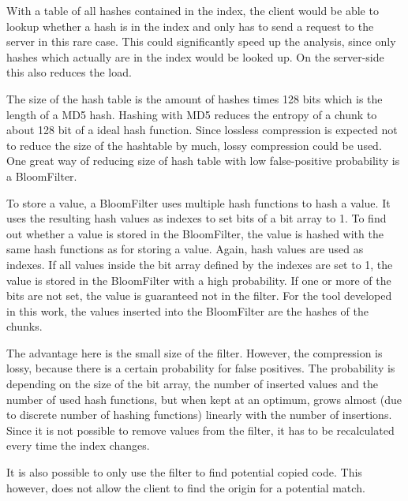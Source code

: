 With a table of all hashes contained in the index, the client would be able to lookup whether a hash is in the index and only has to send a request to the server in this rare case.
This could significantly speed up the analysis, since only hashes which actually are in the index would be looked up.
On the server-side this also reduces the load.

The size of the hash table is the amount of hashes times 128 bits which is the length of a MD5 hash.
Hashing with MD5 reduces the entropy of a chunk to about 128 bit of a ideal hash function.
Since lossless compression is expected not to reduce the size of the hashtable by much, lossy compression could be used.
One great way of reducing size of hash table with low false-positive probability is a BloomFilter.

To store a value, a BloomFilter uses multiple hash functions to hash a value\cite{bloom1970filter}.
It uses the resulting hash values as indexes to set bits of a bit array to 1.
To find out whether a value is stored in the BloomFilter, the value is hashed with the same hash functions as for storing a value.
Again, hash values are used as indexes.
If all values inside the bit array defined by the indexes are set to 1, the value is stored in the BloomFilter with a high probability.
If one or more of the bits are not set, the value is guaranteed not in the filter.
For the tool developed in this work, the values inserted into the BloomFilter are the hashes of the chunks.


The advantage here is the small size of the filter.
However, the compression is lossy, because there is a certain probability for false positives.
The probability is depending on the size of the bit array, the number of inserted values and the number of used hash functions, but when kept at an optimum, grows almost (due to discrete number of hashing functions) linearly with the number of insertions.
Since it is not possible to remove values from the filter, it has to be recalculated every time the index changes.

It is also possible to only use the filter to find potential copied code.
This however, does not allow the client to find the origin for a potential match.
	
